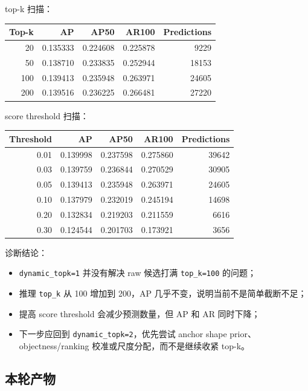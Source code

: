 \documentclass[UTF8]{ctexart}
\begin{document}
top-k 扫描：

\begin{center}
\begin{tabular}{rrrrr}
\toprule
Top-k & AP & AP50 & AR100 & Predictions \\
\midrule
20 & 0.135333 & 0.224608 & 0.225878 & 9229 \\
50 & 0.138710 & 0.233835 & 0.252944 & 18153 \\
100 & 0.139413 & 0.235948 & 0.263971 & 24605 \\
200 & 0.139516 & 0.236225 & 0.266481 & 27220 \\
\bottomrule
\end{tabular}
\end{center}

score threshold 扫描：

\begin{center}
\begin{tabular}{rrrrr}
\toprule
Threshold & AP & AP50 & AR100 & Predictions \\
\midrule
0.01 & 0.139998 & 0.237598 & 0.275860 & 39642 \\
0.03 & 0.139759 & 0.236844 & 0.270529 & 30905 \\
0.05 & 0.139413 & 0.235948 & 0.263971 & 24605 \\
0.10 & 0.137979 & 0.232019 & 0.245194 & 14698 \\
0.20 & 0.132834 & 0.219203 & 0.211559 & 6616 \\
0.30 & 0.124544 & 0.201703 & 0.173921 & 3656 \\
\bottomrule
\end{tabular}
\end{center}

诊断结论：

\begin{itemize}[leftmargin=2em]
  \item \texttt{dynamic\_topk=1} 并没有解决 raw 候选打满 \texttt{top\_k=100} 的问题；
  \item 推理 \texttt{top\_k} 从 100 增加到 200，AP 几乎不变，说明当前不是简单截断不足；
  \item 提高 score threshold 会减少预测数量，但 AP 和 AR 同时下降；
  \item 下一步应回到 \texttt{dynamic\_topk=2}，优先尝试 anchor shape prior、objectness/ranking 校准或尺度分配，而不是继续收紧 top-k。
\end{itemize}

\subsection{本轮产物}
\end{document}
